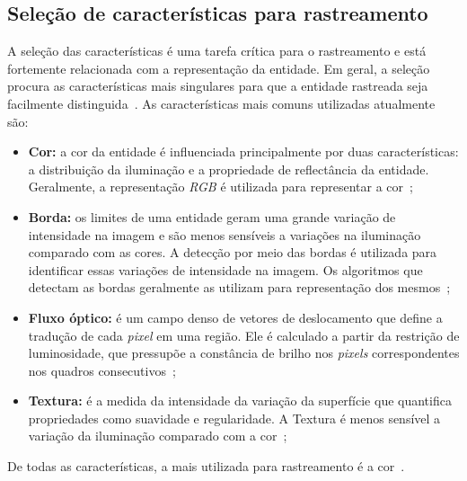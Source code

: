 
\subsection{Seleção de características para rastreamento}

	A seleção das características é uma tarefa crítica para o rastreamento e está fortemente relacionada com a representação da entidade. Em geral, a seleção procura as características mais singulares para que a entidade rastreada seja facilmente distinguida~\cite{yilmaz}. As características mais comuns utilizadas atualmente são:

	\begin{itemize}
		\item \textbf{Cor:} a cor da entidade é influenciada principalmente por duas
		características: a distribuição da iluminação e a propriedade de reflectância da
		entidade. Geralmente, a representação \textit{RGB} é utilizada para representar
		a cor~\cite{yilmaz};

		\item \textbf{Borda:} os limites de uma entidade geram uma grande variação de
		intensidade na imagem e são menos sensíveis a variações na iluminação comparado
		com as cores. A detecção por meio das bordas é utilizada para identificar essas
		variações de intensidade na imagem. Os algoritmos que detectam as bordas
		geralmente as utilizam para representação dos mesmos~\cite{yilmaz};

		\item \textbf{Fluxo óptico:} é um campo denso de vetores de deslocamento que
		define a tradução de cada \textit{pixel} em uma região. Ele é calculado a
		partir da restrição de luminosidade, que pressupõe a constância de brilho nos
		\textit{pixels} correspondentes nos quadros consecutivos~\cite{yilmaz,
		horn};

		\item \textbf{Textura:} é a medida da intensidade da variação da superfície que
		quantifica propriedades como suavidade e regularidade. A Textura é menos
		sensível a variação da iluminação comparado com a cor~\cite{yilmaz};

	\end{itemize}

De todas as características, a mais utilizada para rastreamento é a cor~\cite{yilmaz}.


